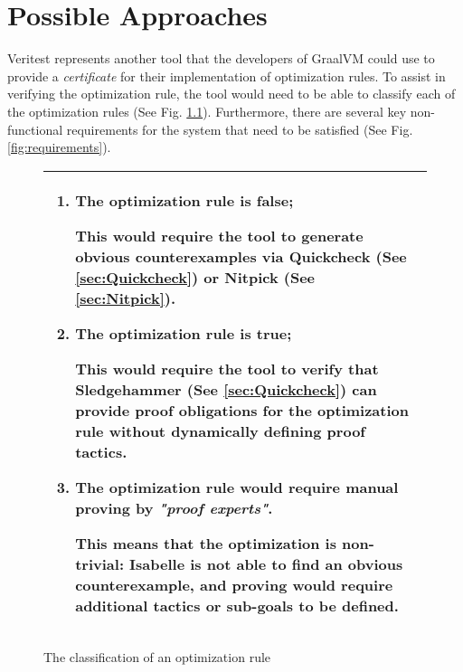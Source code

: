 \chapter{Possible Approaches \label{sec:PossibleApproaches}}

Veritest represents another tool that the developers of GraalVM could use to provide a \emph{certificate} for their implementation of optimization rules. 
To assist in verifying the optimization rule, the tool would need to be able to classify each of the optimization rules 
(See Fig. \ref{fig:classification}). Furthermore, there are several key non-functional requirements for the system that need to be satisfied 
(See Fig. \ref{fig:requirements}).

\begin{figure}[!htb]
      \begin{tabular}{|L{0.95\textwidth}|}
            \hline
            \begin{enumerate}
                  \item The optimization rule is false;
                  
                        This would require the tool to generate obvious counterexamples via Quickcheck (See \ref{sec:Quickcheck}) or Nitpick 
                        (See \ref{sec:Nitpick}).
              
                  \item The optimization rule is true;
                  
                        This would require the tool to verify that Sledgehammer (See \ref{sec:Quickcheck}) can provide proof obligations for the 
                        optimization rule \textbf{without} dynamically defining proof tactics.
              
                  \item The optimization rule would require manual proving by \emph{"proof experts"}.
                        
                        This means that the optimization is non-trivial: Isabelle is not able to find an obvious counterexample, and proving would require 
                        additional tactics or sub-goals to be defined.
            \end{enumerate} \\
            \hline
      \end{tabular}
      \caption{The classification of an optimization rule}
      \label{fig:classification}
\end{figure}

